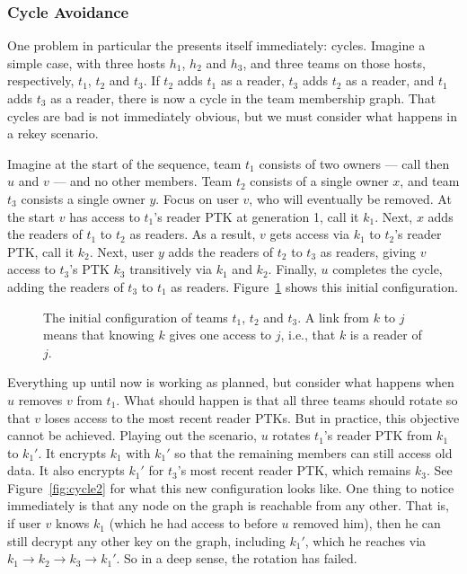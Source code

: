 \subsubsection{Cycle Avoidance}
\label{sec:team-index-range}

One problem in particular the presents itself immediately: cycles.
Imagine a simple case, with three hosts $h_1$, $h_2$ and $h_3$, and three teams
on those hosts, respectively, $t_1$, $t_2$ and $t_3$. If $t_2$ adds $t_1$ as a
reader, $t_3$ adds $t_2$ as a reader, and $t_1$ adds $t_3$ as a reader, there is
now a cycle in the team membership graph. That cycles are bad is not immediately
obvious, but we must consider what happens in a rekey scenario.

Imagine at the start of the sequence, team $t_1$ consists of two owners --- call
then $u$ and $v$ --- and no other members. Team $t_2$ consists of a single owner
$x$, and team $t_3$ consists a single owner $y$. Focus on user $v$, who will
eventually be removed.  At the start $v$ has access to $t_1$'s reader PTK at
generation 1, call it $k_1$.  Next, $x$ adds the readers of $t_1$ to $t_2$
as readers. As a result, $v$ gets access via $k_1$ to $t_2$'s reader PTK,
call it $k_2$. Next, user $y$ adds the readers of $t_2$ to $t_3$ as readers,
giving $v$ access to $t_3$'s PTK $k_3$ transitively via $k_1$ and $k_2$.
Finally, $u$ completes the cycle, adding the readers of $t_3$ to $t_1$ as readers.
Figure~\ref{fig:cycle1} shows this initial configuration. 

\begin{figure}[ht]
    \centering
    \caption{The initial configuration of teams $t_1$, $t_2$ and $t_3$.
A link from $k$ to $j$ means that knowing $k$ gives one access to $j$, i.e., that $k$ is a reader of $j$.}
    \label{fig:cycle1}
\end{figure}


Everything up until now is working as planned, but consider what happens when
$u$ removes $v$ from $t_1$. What should happen is that all three teams should 
rotate so that $v$ loses access to the most recent reader PTKs. But in practice, this
objective cannot be achieved. Playing out the scenario, $u$ rotates $t_1$'s reader PTK
from $k_1$ to $k_1'$. It encrypts $k_1$ with $k_1'$ so that the remaining 
members can still access old data. It also encrypts $k_1'$ for $t_3$'s most recent reader
PTK, which remains $k_3$. See Figure~\ref{fig:cycle2} for what this new configuration looks like.
One thing to notice immediately is that any node on the graph is reachable from any other. That is,
if user $v$ knows $k_1$ (which he had access to before $u$ removed him), then he can still
decrypt any other key on the graph, including $k_1'$, which he reaches via
$k_1 \rightarrow k_2 \rightarrow k_3 \rightarrow k_1'$. So in a deep sense, the 
rotation has failed. 

